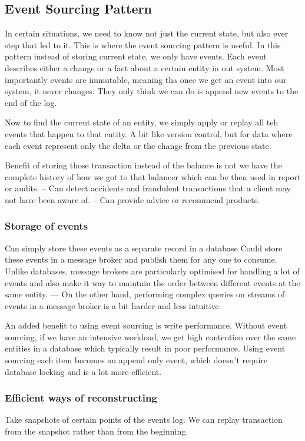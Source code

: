 \subsection{Event Sourcing Pattern}
In certain situations, we need to know not just the current state, but also ever step that led to it.
This is where the event sourcing pattern is useful.
In this pattern instead of storing current state, we only have events.
Each event describes either a change or a fact about a certain entity in out system.
Most importantly events are immutable, meaning tha once we get an event into our system, it never changes.
They only think we can do is append new events to the end of the log.

Now to find the current state of an entity, we simply apply or replay all teh events that happen to that entity.
A bit like version control, but for data where each event represent only the delta or the change from the previous state.

Benefit of storing those transaction instead of the balance is not we have the complete history of how we got to that balancer which can be then used in report or audits.
-- Can detect accidents and fraudulent transactions that a client may not have been aware of.
-- Can provide advice or recommend products.

\subsubsection{Storage of events}
Can simply store these events as a separate record in a database
Could store these events in a message broker and publish them for any one to consume.
Unlike databases, message brokers are particularly optimised for handling a lot of events and also make it way to maintain the order between different events at the same entity.
--- On the other hand, performing complex queries on streams of events in a message broker is a bit harder and less intuitive.

An added benefit to using event sourcing is write performance.
Without event sourcing, if we have an intensive workload, we get high contention over the same entities in a database which typically result in poor performance.
Using event sourcing each item becomes an append only event, which doesn't require database locking and is a lot more efficient.

\subsubsection{Efficient ways of reconstructing}
Take snapshots of certain points of the events log.
We can replay transaction from the snapshot rather than from the beginning.

